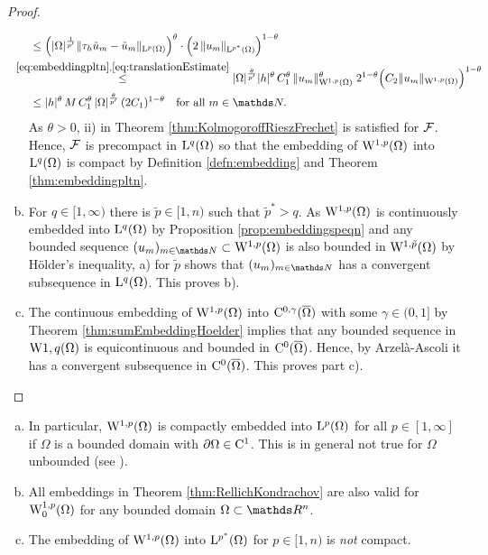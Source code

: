 \begin{proof}
\begin{enumerate}[a)]
\begin{align*}
        &\leq \Big( |\Omega|^{\frac{1}{p'}} \|\tau_h \tilde u_m - \tilde u_m \|_{\Ell^p(\Omega)} \Big)^\theta \cdot \Big( 2\, \|u_m \|_{\Ell^{p^*}(\Omega)} \Big)^{1 - \theta} \\
        &\hspace{-1.5em}\overset{\eqref{eq:embeddingpltn},\eqref{eq:translationEstimate}} \leq |\Omega|^{\frac{\theta}{p'}} |h|^\theta \, C_1^\theta \, \|u_m\|_{\WW^{1,p}(\Omega)}^\theta \; 2^{1 - \theta} \Big( C_2 \|u_m\|_{\WW^{1,p}(\Omega)} \Big)^{1 - \theta} \\
        &\leq |h|^\theta \, M \, C_1^\theta \, |\Omega|^{\frac{\theta}{p'}} \, (2C_1)^{1 - \theta} \quad\text{for all } m \in \N.
        \end{align*}
        As $\theta > 0$, ii) in Theorem \ref{thm:KolmogoroffRieszFrechet} is satisfied for $\mathcal{F}$.
        Hence, $\mathcal{F}$ is precompact in $\mathrm{L}^q(\Omega)$ so that the embedding of $\mathrm{W}^{1,p}(\Omega)$ into $\mathrm{L}^q(\Omega)$ is compact by Definition \ref{defn:embedding} and Theorem \ref{thm:embeddingpltn}.

      \item For $q \in [1,\infty)$ there is $\tilde p \in [1,n)$ such that $\tilde p^* > q$.
          As $\mathrm{W}^{1,p}(\Omega)$ is continuously embedded into $\mathrm{L}^q(\Omega)$ by Proposition \ref{prop:embeddingspeqn} and any bounded sequence $(u_m)_{m \in \N} \subset \WW^{1,p}(\Omega)$ is also bounded in $\mathrm{W}^{1,\tilde p}(\Omega)$ by Hölder's inequality, a) for $\tilde p$ shows that $(u_m)_{m \in \N}$ has a convergent subsequence in $\mathrm{L}^q(\Omega)$.
          This proves b).

      \item The continuous embedding of $\mathrm{W}^{1,p}(\Omega)$ into $\mathrm{C}^{0,\gamma}(\overline\Omega)$ with some $\gamma \in (0,1]$ by Theorem \ref{thm:sumEmbeddingHoelder} implies that any bounded sequence in $\mathrm{W}{1,q}(\Omega)$ is equicontinuous and bounded in $\mathrm{C}^0(\overline\Omega)$.
        Hence, by Arzel\`a-Ascoli it has a convergent subsequence in $\mathrm{C}^0(\overline\Omega)$.
        This proves part c). \qedhere
  \end{enumerate}
\end{proof}

\begin{rem}
  \begin{enumerate}[a)]
    \item In particular, $\mathrm{W}^{1,p}(\Omega)$ is compactly embedded into $\mathrm{L}^p(\Omega)$ for all $p \in [1,\infty]$ if $\Omega$ is a bounded domain with $\partial\Omega \in \mathrm{C}^1$.
      This is in general not true for $\Omega$ unbounded (see \cite{adams2003sobolev}).
    \item All embeddings in Theorem \ref{thm:RellichKondrachov} are also valid for $\mathrm{W}_0^{1,p}(\Omega)$ for any bounded domain $\Omega \subset \R^n$.
    \item The embedding of $\mathrm{W}^{1,p}(\Omega)$ into $\mathrm{L}^{p^*}(\Omega)$ for $p \in [1,n)$ is \emph{not} compact.
  \end{enumerate}
\end{rem}
